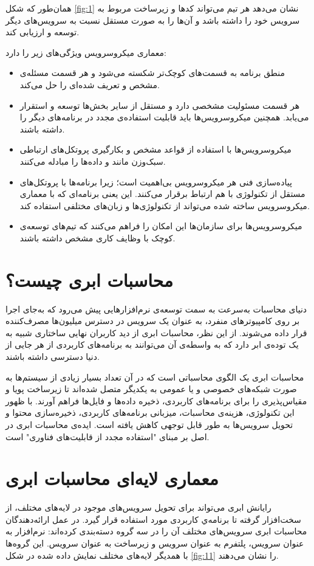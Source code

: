 \documentclass[a4paper,12pt]{book}
\begin{document}
	همان‌طور که شکل \ref{fig:1} نشان می‌دهد هر تیم می‌تواند کدها و زیرساخت مربوط به سرویس خود را داشته باشد و آن‌ها را به صورت مستقل نسبت‌ به سرویس‌های دیگر توسعه و ارزیابی کند.
	
	\vskip 0.2cm
	معماری میکروسرویس ویژگی‌های زیر را دارد:
	\begin{itemize}[label=$\ast$]
		\item  منطق برنامه به قسمت‌های کوچک‌تر شکسته می‌شود و هر قسمت مسئله‌ی مشخص و تعریف شده‌ای را حل می‌کند.
		\item هر قسمت مسئولیت مشخصی دارد و مستقل از سایر بخش‌ها توسعه و استقرار می‌یابد. همچنین میکروسرویس‌ها باید قابلیت استفاده‌ی مجدد در برنامه‌های دیگر را داشته باشند.
		\item میکروسرویس‌ها با استفاده از قواعد مشخص و بکارگیری پروتکل‌های ارتباطی سبک‌وزن مانند  و 
		داده‌ها را مبادله می‌کنند.
		\item پیاده‌سازی فنی هر میکروسرویس بی‌اهمیت است؛ زیرا برنامه‌ها با پروتکل‌های مستقل از تکنولوژی
		با هم ارتباط برقرار می‌کنند. این یعنی برنامه‌‌ای که با معماری میکروسرویس ساخته شده می‌تواند از تکنولوژی‌ها و زبان‌های مختلفی استفاده کند. 
		\item میکروسرویس‌ها برای سازمان‌ها این امکان را فراهم می‌کنند که تیم‌های توسعه‌ی کوچک با وظایف کاری مشخص داشته باشند.
	\end{itemize} 
	
	
	\section{محاسبات ابری چیست؟}
	دنیای محاسبات به‌سرعت به‌ سمت توسعه‌ی نرم‌افزارهایی پیش می‌رود که به‌جای اجرا بر روی کامپیوترهای منفرد، به عنوان یک سرویس در دسترس میلیون‌ها مصرف‌کننده قرار داده می‌شوند. از این نظر، محاسبات ابری از دید کاربران نهایی ساختاری شبیه به یک توده‌ی ابر دارد که به واسطه‌ی آن می‌توانند به برنامه‌های کاربردی از هر جایی از دنیا دسترسی داشته باشند. 
	
	محاسبات ابری یک الگوی محاسباتی است که در آن تعداد بسیار زیادی از سیستم‌ها به صورت شبکه‌های خصوصی و یا عمومی به یکدیگر متصل شده‌اند تا زیرساخت پویا و مقیاس‌پذیری را برای برنامه‌های کاربردی، ذخیره داده‌ها و فایل‌ها فراهم آورند. با ظهور این تکنولوژی، هزینه‌ی محاسبات، میزبانی برنامه‌های کاربردی، ذخیره‌سازی محتوا و تحویل سرویس‌ها به طور قابل توجهی کاهش یافته است. ایده‌ی محاسبات ابری در اصل بر مبنای "استفاده مجدد از قابلیت‌های فناوری" است.
	
	\section{معماری لایه‌ای محاسبات ابری}
	رایانش ابری می‌تواند برای تحویل سرویس‌های موجود در لایه‌های مختلف، از سخت‌افزار گرفته تا برنامه‌ي کاربردی مورد استفاده قرار گیرد. در عمل ارائه‌دهندگان محاسبات ابری سرویس‌های مختلف آن را در سه گروه دسته‌بندی کرده‌اند: نرم‌افزار به عنوان سرویس،
	پلتفرم به عنوان سرویس
	و زیرساخت به عنوان سرویس.
	این گروه‌ها با همدیگر لایه‌های مختلف نمایش داده شده در شکل \ref{fig:11} را نشان می‌دهند.
	
\end{document}
